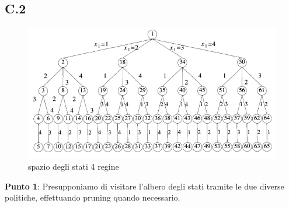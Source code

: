 \documentclass[a4paper]{article}
\begin{document}
\subsection{C.2}
\begin{figure}[!ht]
\centering
\includegraphics[width=1\textwidth]{./img/C_2.png}
\caption{spazio degli stati 4 regine} \label{FIG:C_2}
\end{figure}
\textbf{Punto 1}: Presupponiamo di visitare l'albero degli stati tramite le due diverse politiche, effettuando pruning quando necessario.
\end{document}

